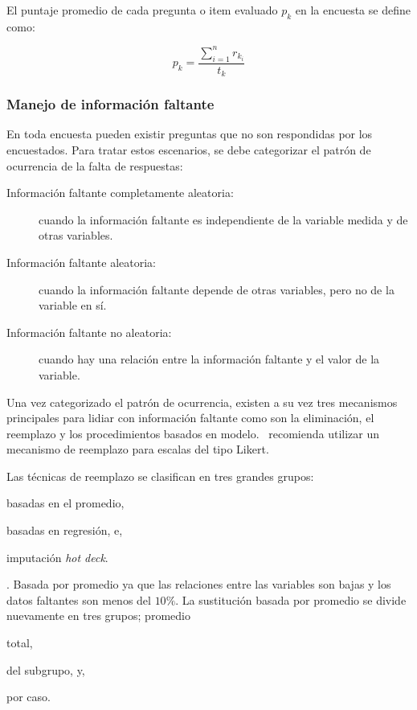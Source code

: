 El puntaje promedio de cada pregunta o item evaluado  $p_k$ en la encuesta se
define como:

\begin{equation}
p_k = \frac{\sum_{i=1}^n{r_{k_i}}}{t_k}
\end{equation}

\subsubsection{Manejo de información faltante}
\label{sec:informacion_faltante}

En toda encuesta pueden existir preguntas que no son respondidas por los
encuestados. Para tratar estos escenarios, se debe categorizar el patrón de
ocurrencia de la falta de
respuestas\cite{leite2010performance,tsikriktsis2005review}:

\begin{description}
    \item[Información faltante completamente aleatoria:] cuando la información
        faltante es independiente de la variable medida y de otras variables.
    \item[Información faltante aleatoria:] cuando la información faltante
        depende de otras variables, pero no de la variable en sí. 
    \item[Información faltante no aleatoria:] cuando hay una relación entre la
        información faltante y el valor de la variable.
\end{description}

Una vez categorizado el patrón de ocurrencia, existen a su vez tres
mecanismos~\cite{tsikriktsis2005review} principales para lidiar con información
faltante como son la eliminación, el reemplazo y los  procedimientos basados en
modelo.~\cite{tsikriktsis2005review} recomienda utilizar un mecanismo de
reemplazo para escalas del tipo Likert.

Las técnicas de reemplazo se clasifican en tres grandes
grupos\cite{tsikriktsis2005review}:
\begin{enumerate*}[label=\itshape\alph*\upshape)]
\item basadas en el promedio,
\item basadas en regresión, e,
\item imputación \emph{hot deck}.
\end{enumerate*}

. Basada por
promedio ya que las relaciones entre las variables son bajas y los datos
faltantes son menos del $10\%$. La sustitución basada por promedio se divide
nuevamente en tres grupos\cite{tsikriktsis2005review}; promedio
\begin{enumerate*}[label=\itshape\alph*\upshape.]
\item total,
\item del subgrupo, y,
\item por caso.
\end{enumerate*}

